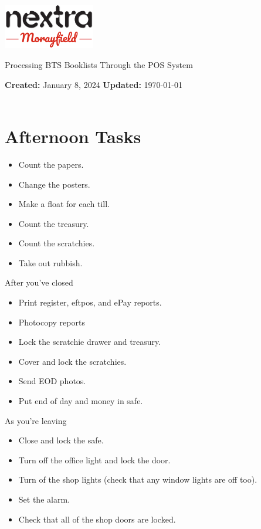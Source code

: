 \documentclass[a4paper, 12pt]{article}
\let\Huge\headingfont
\begin{document}
\begin{titlepage}
	\begin{minipage}[t]{1\columnwidth}
		\begin{flushright}
       	\vspace{-0.6in}
       	\includegraphics[width=0.3\textwidth]{MonextraNew.png}
			\vspace{0.5in}
		\par\end{flushright}
	\end{minipage}

	\begin{center}
		{\Huge Processing BTS Booklists Through the POS System}
	\end{center}
	\vspace{2em}
	\noindent
	\textbf{Created:} January 8, 2024
	\hfill
	\textbf{Updated:} \today
	\\\\\indent
	
	
	\tableofcontents
\end{titlepage}

\newpage
\section{Afternoon Tasks}
\begin{itemize}
    \item Count the papers.
    \item Change the posters.
    \item Make a float for each till.
    \item Count the treasury.
    \item Count the scratchies.
    \item Take out rubbish.
\end{itemize}
\newline
After you've closed
\begin{itemize}
    \item Print register, eftpos, and ePay reports.
    \item Photocopy reports
    \item Lock the scratchie drawer and treasury.
    \item Cover and lock the scratchies.
    \item Send EOD photos.
    \item Put end of day and money in safe.
\end{itemize}
\newline
As you're leaving
\begin{itemize}
    \item Close and lock the safe.
    \item Turn off the office light and lock the door.
    \item Turn of the shop lights (check that any window lights are off too).
    \item Set the alarm.
    \item Check that all of the shop doors are locked.
\end{itemize}
\end{document}
